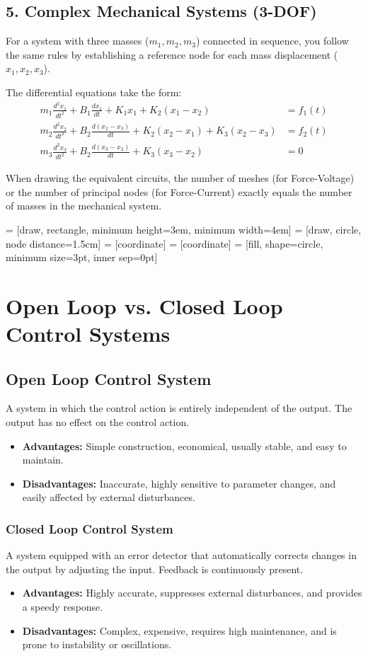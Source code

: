 \documentclass[12pt]{article}
\begin{document}
\subsection*{5. Complex Mechanical Systems (3-DOF)}
For a system with three masses ($m_1, m_2, m_3$) connected in sequence, you follow the same rules by establishing a reference node for each mass displacement ($x_1, x_2, x_3$).

The differential equations take the form:
\begin{align*}
    m_1 \frac{d^2x_1}{dt^2} + B_1 \frac{dx_1}{dt} + K_1 x_1 + K_2(x_1 - x_2) &= f_1(t) \\
    m_2 \frac{d^2x_2}{dt^2} + B_2 \frac{d(x_2 - x_3)}{dt} + K_2(x_2 - x_1) + K_3(x_2 - x_3) &= f_2(t) \\
    m_3 \frac{d^2x_3}{dt^2} + B_2 \frac{d(x_3 - x_2)}{dt} + K_3(x_3 - x_2) &= 0
\end{align*}

When drawing the equivalent circuits, the number of meshes (for Force-Voltage) or the number of principal nodes (for Force-Current) exactly equals the number of masses in the mechanical system.


 = [draw, rectangle, minimum height=3em, minimum width=4em]
 = [draw, circle, node distance=1.5cm]
 = [coordinate]
 = [coordinate]
 = [fill, shape=circle, minimum size=3pt, inner sep=0pt]


\section{Open Loop vs. Closed Loop Control Systems}

\subsection{Open Loop Control System}
A system in which the control action is entirely independent of the output. The output has no effect on the control action. 
\begin{itemize}
    \item \textbf{Advantages:} Simple construction, economical, usually stable, and easy to maintain.
    \item \textbf{Disadvantages:} Inaccurate, highly sensitive to parameter changes, and easily affected by external disturbances.
\end{itemize}

\subsubsection*{Closed Loop Control System}
A system equipped with an error detector that automatically corrects changes in the output by adjusting the input. Feedback is continuously present.
\begin{itemize}
    \item \textbf{Advantages:} Highly accurate, suppresses external disturbances, and provides a speedy response.
    \item \textbf{Disadvantages:} Complex, expensive, requires high maintenance, and is prone to instability or oscillations.
\end{itemize}
\end{document}
